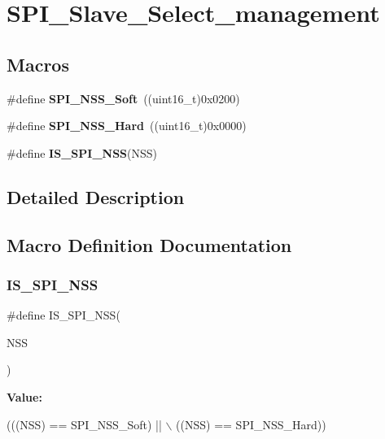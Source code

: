 \hypertarget{group___s_p_i___slave___select__management}{}\section{S\+P\+I\+\_\+\+Slave\+\_\+\+Select\+\_\+management}
\label{group___s_p_i___slave___select__management}
\subsection*{Macros}
\begin{DoxyCompactItemize}
\item 
\mbox{\label{group___s_p_i___slave___select__management_ga105969ee7eb635414da35b41e942e383}} 
\#define {\bfseries S\+P\+I\+\_\+\+N\+S\+S\+\_\+\+Soft}~((uint16\+\_\+t)0x0200)
\item 
\mbox{\label{group___s_p_i___slave___select__management_ga07c547459d39fb7a6e0322147a60b74a}} 
\#define {\bfseries S\+P\+I\+\_\+\+N\+S\+S\+\_\+\+Hard}~((uint16\+\_\+t)0x0000)
\item 
\#define {\bfseries I\+S\+\_\+\+S\+P\+I\+\_\+\+N\+SS}(N\+SS)
\end{DoxyCompactItemize}


\subsection{Detailed Description}


\subsection{Macro Definition Documentation}
\mbox{\label{group___s_p_i___slave___select__management_gabbeedf42eccef1bae4f88c606fc3b261}} 
\subsubsection{\texorpdfstring{I\+S\+\_\+\+S\+P\+I\+\_\+\+N\+SS}{IS\_SPI\_NSS}}
{\footnotesize\ttfamily \#define I\+S\+\_\+\+S\+P\+I\+\_\+\+N\+SS(\begin{DoxyParamCaption}\item[{}]{N\+SS }\end{DoxyParamCaption})}

{\bfseries Value\+:}
\begin{DoxyCode}
(((NSS) == SPI\_NSS\_Soft) || \(\backslash\)
                         ((NSS) == SPI\_NSS\_Hard))
\end{DoxyCode}
